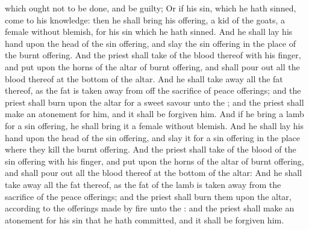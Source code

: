 {{}
{} which ought not to be
done, and be
guilty;
Or if his
sin, which he hath
sinned, come to his
knowledge: then he shall
bring his
offering, a
kid of the
goats, a
female without
blemish, for his
sin which he hath
sinned.
And he shall
lay his
hand upon the
head of the sin
offering, and
slay the sin
offering in the
place of the burnt
offering.
And the
priest shall
take of the
blood thereof with his
finger, and
put
{} upon the
horns of the
altar of burnt
offering, and shall pour
out all the
blood thereof at the
bottom of the
altar.
And he shall take
away all the
fat thereof, as the
fat is taken
away from off the
sacrifice of peace
offerings; and the
priest shall
burn
{} upon the
altar for a
sweet
savour unto the
{}; and the
priest shall make an
atonement for him, and it shall be
forgiven him.
And if he
bring a
lamb for a
sin
offering, he shall
bring it a
female without
blemish.
And he shall
lay his
hand upon the
head of the sin
offering, and
slay it for a sin
offering in the
place where they
kill the burnt
offering.
And the
priest shall
take of the
blood of the sin
offering with his
finger, and
put
{} upon the
horns of the
altar of burnt
offering, and shall pour
out all the
blood thereof at the
bottom of the
altar:
And he shall take
away all the
fat thereof, as the
fat of the
lamb is taken
away from the
sacrifice of the peace
offerings; and the
priest shall
burn them upon the
altar, according to the offerings made by
fire unto the
{}: and the
priest shall make an
atonement for his
sin that he hath
committed, and it shall be
forgiven him.

}
